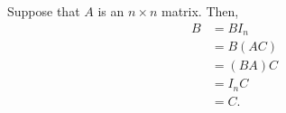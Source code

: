 Suppose that $A$ is an $n\times n$ matrix.
Then,
\begin{align*}
    B &= BI_n \\
    &= B(AC) \\
    &= (BA)C \\
    &= I_nC \\
    &= C.
\end{align*}
